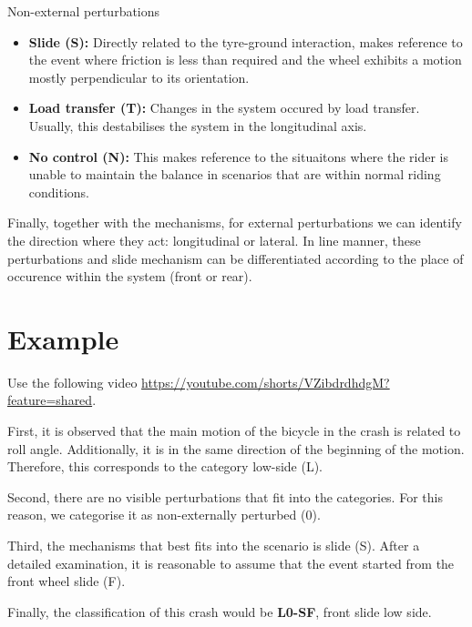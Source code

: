 \documentclass{article}
\begin{document}
Non-external perturbations
\begin{itemize}
    \item \textbf{Slide (S):} Directly related to the tyre-ground interaction, makes reference to the event where friction is less than required and the wheel exhibits a motion mostly perpendicular to its orientation.
    \item \textbf{Load transfer (T):} Changes in the system occured by load transfer.
        Usually, this destabilises the system in the longitudinal axis.
    \item \textbf{No control (N):} This makes reference to the situaitons where the rider is unable to maintain the balance in scenarios that are within normal riding conditions.
\end{itemize}

Finally, together with the mechanisms, for external perturbations we can identify the direction where they act: longitudinal or lateral.
%
In line manner, these perturbations and slide mechanism can be differentiated according to the place of occurence within the system (front or rear).


\section{Example}

Use the following video \url{https://youtube.com/shorts/VZibdrdhdgM?feature=shared}.

First, it is observed that the main motion of the bicycle in the crash is related to roll angle.
%
Additionally, it is in the same direction of the beginning of the motion.
%
Therefore, this corresponds to the category low-side (L).


Second, there are no visible perturbations that fit into the categories.
%
For this reason, we categorise it as non-externally perturbed (0).


Third, the mechanisms that best fits into the scenario is slide (S).
%
After a detailed examination, it is reasonable to assume that the event started from the front wheel slide (F).


Finally, the classification of this crash would be \textbf{L0-SF}, front slide low side.
\end{document}
